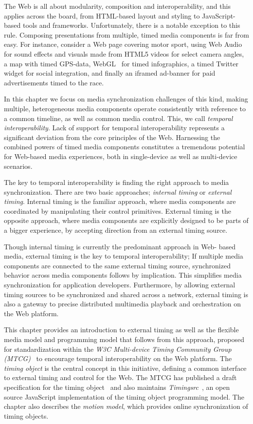 The Web is all about modularity, composition and interoperability, and this
applies across the board, from HTML-based layout and styling to JavaScript-
based  tools and frameworks. Unfortunately, there is a notable exception to
this rule. Composing presentations from multiple, timed media components is
far from easy. For instance, consider a Web page covering motor sport, using
Web Audio~\cite{webaudio} for sound effects and visuals made from HTML5 videos
for select camera angles, a map with timed GPS-data, WebGL~\cite{webgl} for
timed infographics, a timed Twitter~\cite{twitter} widget for social
integration, and finally an iframed ad-banner for paid advertisements timed to
the race.

In this chapter we focus on media synchronization challenges of this kind,
making multiple, heterogeneous media components operate consistently with
reference to a common timeline, as well as common media control. This, we call
\emph{temporal interoperability}. Lack of support for temporal
interoperability represents a significant deviation from the core principles
of the Web. Harnessing the combined powers of timed media components
constitutes a tremendous potential for Web-based media experiences, both in
single-device as well as multi-device scenarios.

The key to temporal interoperability is finding the right approach to media
synchronization. There are two basic approaches; \emph{internal
timing} or \emph{external timing}. Internal timing
is the familiar approach, where media components are coordinated by
manipulating their control primitives. External timing is the
opposite approach, where media components are explicitly designed to be parts
of a bigger experience, by accepting direction from an external timing source.

Though internal timing is currently the predominant approach in Web-
based media, external timing is the key to temporal interoperability;
If multiple media components are connected to the same external timing source,
synchronized behavior across media components follows by implication. This
simplifies media synchronization for application developers. Furthermore,
by allowing external timing sources to be synchronized and shared across a
network, external timing is also a gateway to precise distributed multimedia
playback and orchestration on the Web platform.

This chapter provides an introduction to external timing as well as the
flexible media model and programming model that follows from this approach,
proposed for standardization within the \emph{W3C Multi-device Timing
Community Group (MTCG)}~\cite{mtcg} to encourage temporal interoperability on
the Web platform. The \emph{timing object} is the central concept in this
initiative, defining a common interface to external timing and control for the
Web. The MTCG has published a draft specification for the timing
object~\cite{timingobject} and also maintains
\emph{Timingsrc}~\cite{timingsrc}, an open source JavaScript implementation of
the timing object programming model. The chapter also describes the
\emph{motion model}, which provides online synchronization of timing objects.

